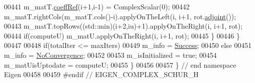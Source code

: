 \begin{DoxyCode}
00441       m\_matT.\hyperlink{class_eigen_1_1_plain_object_base_a25626a55b26a4323565f79d1b7c48ea8}{coeffRef}(i+1,i-1) = ComplexScalar(0);
00442       m\_matT.rightCols(m\_matT.cols()-i).applyOnTheLeft(i, i+1, rot.\hyperlink{group___jacobi___module_a89c8ea615f8fa77ddd5810a1e5fde4da}{adjoint}());
00443       m\_matT.topRows((std::min)(i+2,iu)+1).applyOnTheRight(i, i+1, rot);
00444       \textcolor{keywordflow}{if}(computeU) m\_matU.applyOnTheRight(i, i+1, rot);
00445     \}
00446   \}
00447 
00448   \textcolor{keywordflow}{if}(totalIter <= maxIters)
00449     m\_info = \hyperlink{group__enums_gga85fad7b87587764e5cf6b513a9e0ee5ea52581b035f4b59c203b8ff999ef5fcea}{Success};
00450   \textcolor{keywordflow}{else}
00451     m\_info = \hyperlink{group__enums_gga85fad7b87587764e5cf6b513a9e0ee5eaba1c8763d1179778070f365ecc4157a8}{NoConvergence};
00452 
00453   m\_isInitialized = \textcolor{keyword}{true};
00454   m\_matUisUptodate = computeU;
00455 \}
00456 
00457 \} \textcolor{comment}{// end namespace Eigen}
00458 
00459 \textcolor{preprocessor}{#endif // EIGEN\_COMPLEX\_SCHUR\_H}
\end{DoxyCode}
